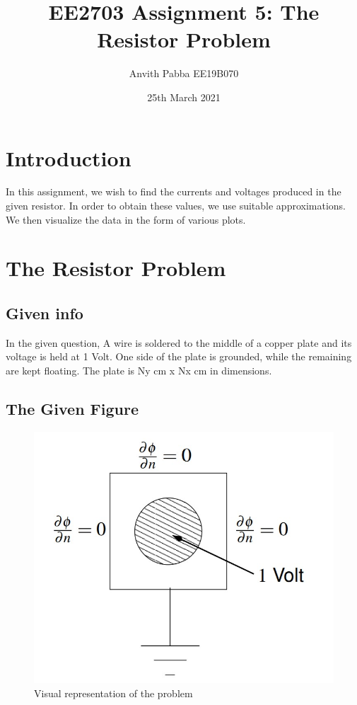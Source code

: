 \documentclass[11pt]{article}
\title{EE2703 Assignment 5: The Resistor Problem}
\author{Anvith Pabba EE19B070}
\date{25th March 2021}
\begin{document}
\maketitle

\section{Introduction}
In this assignment, we wish to find the currents and voltages produced in the given resistor. In order to obtain these values, we use suitable approximations. We then visualize the data in the form of various plots. 

\section{The Resistor Problem}
\subsection{Given info}
In the given question, A wire is soldered to the middle of a copper plate and its voltage is held at 1 Volt. One side of the plate is grounded, while the remaining are kept floating. The plate is Ny cm x Nx cm in dimensions.

\subsection{The Given Figure}
\begin{figure}[H]
    \centering
    \includegraphics[scale = 1]{Problem_1.jpg}
    \caption{Visual representation of the problem}
\end{figure}
\end{document}
